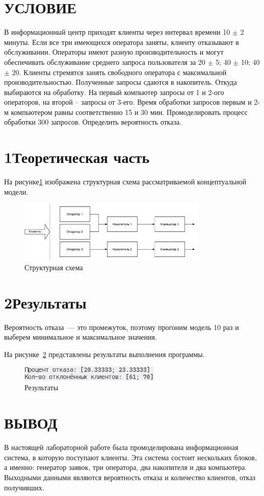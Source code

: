 \section*{\hfill{}УСЛОВИЕ\hfill{}}
В информационный центр приходят клиенты через интервал времени 10 $\pm$ 2 минуты. Если все три имеющихся оператора заняты, клиенту отказывают в обслуживании. Операторы имеют разную производительность и могут обеспечивать обслуживание среднего запроса пользователя за 20 $\pm$ 5; 40 $\pm$ 10; 40 $\pm$ 20. Клиенты стремятся занять свободного оператора с максимальной производительностью. Полученные запросы сдаются в накопитель. Откуда выбираются на обработку. На первый компьютер запросы от 1 и 2-ого операторов, на второй – запросы от 3-его. Время обработки запросов первым и 2-м компьютером равны соответственно 15 и 30 мин. Промоделировать процесс обработки 300 запросов. Определить вероятность отказа.

\section*{\hspace{1.25cm}1\quad{}Теоретическая часть}
На рисунке\ref{img:concept} изображена структурная схема рассматриваемой концептуальной модели.
\begin{figure}[H]
    \centering
    \includegraphics[width=0.8\textwidth]{pdf/concept.pdf}
    \caption{Структурная схема}
    \label{img:concept}
\end{figure}

\section*{\hspace{1.25cm}2\quad{}Результаты}
Вероятность отказа~--- это промежуток, поэтому прогоним модель 10 раз и выберем минимальное и максимальное значения.

На рисунке~\ref{img:results} представлены результаты выполнения программы.
\begin{figure}[H]
    \centering
    \includegraphics[width=0.6\textwidth]{images/scr01.png}
    \caption{Результаты}
    \label{img:results}
\end{figure}

\section*{\hfill{}ВЫВОД\hfill{}}
В настоящей лабораторной работе была промоделирована информационная система, в которую поступают клиенты. Эта система состоит нескольких блоков, а именно: генератор заявок, три оператора, два накопителя и два компьютера. Выходными данными являются вероятность отказа и количество клиентов, отказ получивших.
